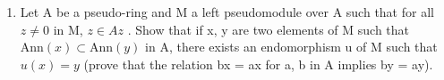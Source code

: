 \BourbakiAppendixExercises

\begin{enumerate}
\def\labelenumi{\arabic{enumi}.}
\tightlist
\item
  Let A be a pseudo-ring and M a left pseudomodule over A such that for all \(z \neq 0\) in M, \(z \in Az\) . Show that if x, y are two elements of M such that \(\text{Ann}(x) \subset \text{Ann}(y)\) in A, there exists an endomorphism u of M such that \(u(x) = y\) (prove that the relation bx = ax for a, b in A implies by = ay).
\end{enumerate}

